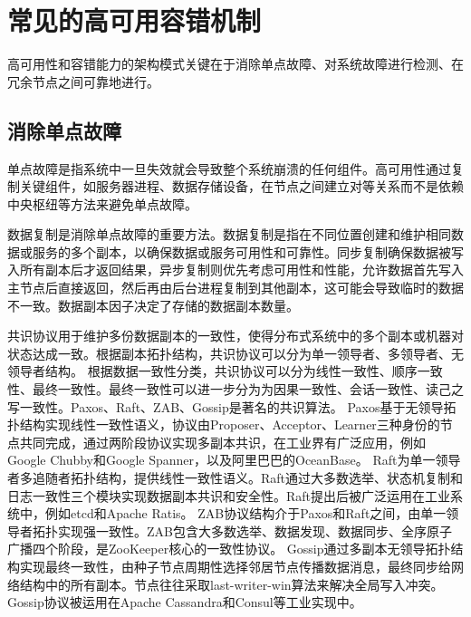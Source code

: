 \section{常见的高可用容错机制}

高可用性和容错能力的架构模式关键在于消除单点故障、对系统故障进行检测、在冗余节点之间可靠地进行\failover。

\subsection{消除单点故障}

单点故障是指系统中一旦失效就会导致整个系统崩溃的任何组件。高可用性通过复制关键组件，如服务器进程、数据存储设备，在节点之间建立对等关系而不是依赖中央枢纽等方法来避免单点故障。

数据复制是消除单点故障的重要方法。数据复制是指在不同位置创建和维护相同数据或服务的多个副本，以确保数据或服务可用性和可靠性。同步复制确保数据被写入所有副本后才返回结果，异步复制则优先考虑可用性和性能，允许数据首先写入主节点后直接返回，然后再由后台进程复制到其他副本，这可能会导致临时的数据不一致。数据副本因子决定了存储的数据副本数量。


共识协议用于维护多份数据副本的一致性，使得分布式系统中的多个副本或机器对状态达成一致。根据副本拓扑结构，共识协议可以分为单一领导者、多领导者、无领导者结构。
根据数据一致性分类，共识协议可以分为线性一致性\cite{herlihy1990linearizability}、顺序一致性\cite{attiya1994sequential}、最终一致性\cite{bailis2013eventual}。最终一致性可以进一步分为为因果一致性\cite{lloyd2011cops}、会话一致性\cite{mortazavi2018session}、读己之写一致性\cite{nishtala2013memcached}。Paxos、Raft、ZAB、Gossip是著名的共识算法。
Paxos\cite{lamport2001paxos}基于无领导拓扑结构实现线性一致性语义，协议由Proposer、Acceptor、Learner三种身份的节点共同完成，通过两阶段协议实现多副本共识，在工业界有广泛应用，例如Google Chubby\cite{burrows2006chubby}和Google Spanner\cite{corbett2013spanner}，以及阿里巴巴的OceanBase\cite{zhen2014OceanBase}。
Raft\cite{ongaro2014raft}为单一领导者多追随者拓扑结构，提供线性一致性语义。Raft通过大多数选举、状态机复制和日志一致性三个模块实现数据副本共识和安全性。Raft提出后被广泛运用在工业系统中，例如etcd\cite{etcd}和Apache Ratis\cite{ratis}。
ZAB\cite{junqueira2011zab}协议结构介于Paxos和Raft之间，由单一领导者拓扑实现强一致性。ZAB包含大多数选举、数据发现、数据同步、全序原子广播四个阶段，是ZooKeeper\cite{hunt2010zookeeper}核心的一致性协议。
Gossip\cite{demers1987gossip}通过多副本无领导拓扑结构实现最终一致性，由种子节点周期性选择邻居节点传播数据消息，最终同步给网络结构中的所有副本。节点往往采取last-writer-win算法来解决全局写入冲突。Gossip协议被运用在Apache Cassandra\cite{lakshman2010cassandra}和Consul\cite{mishra1993consul}等工业实现中。


